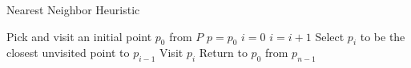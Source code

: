 \begin{algorithm}
\caption{Nearest Neighbor Heuristic}
\begin{algorithmic}
  \STATE Pick and visit an initial point $p_0$ from $P$
  \STATE $p=p_0$
  \STATE $i=0$
    \STATE $i=i+1$
    \STATE Select $p_i$ to be the closest unvisited point to $p_{i-1}$
    \STATE Visit $p_i$
  \ENDWHILE
  \STATE Return to $p_0$ from $p_{n-1}$
\ENDPROCEDURE
\end{algorithmic}
\end{algorithm}